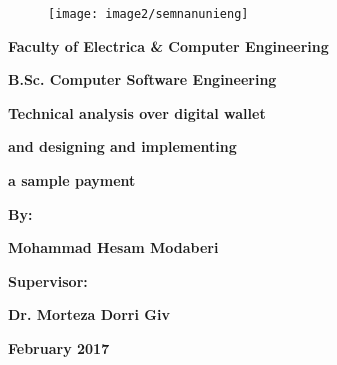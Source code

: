 \documentclass[oneside]{report}
\begin{document}
	
	\begin{latin}
		\begin{figure}
			\centering
			\texttt{[image: image2/semnanunieng]}
		\end{figure}

		\begin{center}
		
		\textbf{\Large Faculty of Electrica \&  Computer Engineering}
		
		\vspace*{1.5cm}
		
		\textbf{\huge B.Sc. Computer Software Engineering}
		
		\vspace*{1.5cm}
		
		\textbf{\huge Technical analysis over digital wallet }			
		
		\vspace*{0.3cm}
					
		\textbf{\huge and designing and implementing}			
		
		\vspace*{0.3cm}
		
		\textbf{\huge a sample payment}			
					
		\vspace*{1.3cm}			
		
		\textbf{\Large By:}
		
		\vspace*{0.5cm}			
		
		\textbf{\huge Mohammad Hesam Modaberi}
		
		\vspace*{1.5cm}
					
		\textbf{\Large Supervisor:}
		
		\vspace*{0.5cm}
		
		\textbf{\huge Dr. Morteza Dorri Giv}
		
		\vspace*{3cm}
		
		\textbf{\LARGE February 2017}		
				
					
		\end{center}
		
	\end{latin}
	
\end{document}
